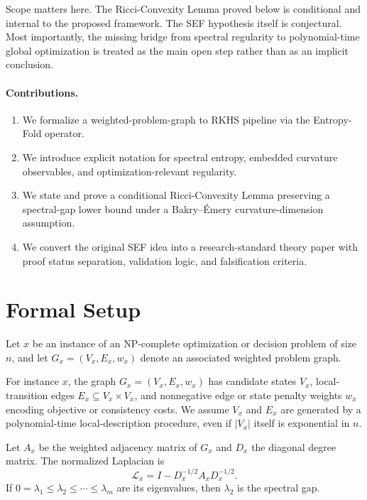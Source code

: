 \documentclass{svjour3}
\begin{document}
Scope matters here. The Ricci-Convexity Lemma proved below is conditional and internal to the proposed framework. The SEF hypothesis itself is conjectural. Most importantly, the missing bridge from spectral regularity to polynomial-time global optimization is treated as the main open step rather than as an implicit conclusion.

\paragraph{Contributions.}
\begin{enumerate}[leftmargin=*]
\item We formalize a weighted-problem-graph to RKHS pipeline via the Entropy-Fold operator.
\item We introduce explicit notation for spectral entropy, embedded curvature observables, and optimization-relevant regularity.
\item We state and prove a conditional Ricci-Convexity Lemma preserving a spectral-gap lower bound under a Bakry--\'Emery curvature-dimension assumption.
\item We convert the original SEF idea into a research-standard theory paper with proof status separation, validation logic, and falsification criteria.
\end{enumerate}

\section{Formal Setup}
Let $x$ be an instance of an NP-complete optimization or decision problem of size $n$, and let $G_x=(V_x,E_x,w_x)$ denote an associated weighted problem graph.

\begin{definition}
For instance $x$, the graph $G_x=(V_x,E_x,w_x)$ has candidate states $V_x$, local-transition edges $E_x\subseteq V_x\times V_x$, and nonnegative edge or state penalty weights $w_x$ encoding objective or consistency costs. We assume $V_x$ and $E_x$ are generated by a polynomial-time local-description procedure, even if $|V_x|$ itself is exponential in $n$.
\end{definition}

\begin{definition}
Let $A_x$ be the weighted adjacency matrix of $G_x$ and $D_x$ the diagonal degree matrix. The normalized Laplacian is
\[
\mathcal{L}_x = I - D_x^{-1/2}A_xD_x^{-1/2}.
\]
If $0=\lambda_1\le \lambda_2\le \cdots \le \lambda_m$ are its eigenvalues, then $\lambda_2$ is the spectral gap.
\end{definition}
\end{document}
